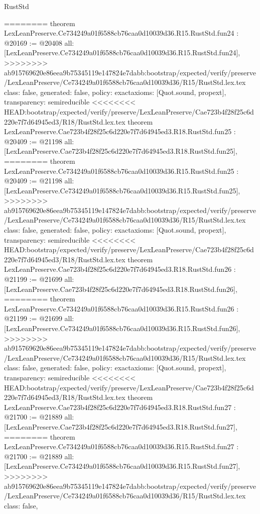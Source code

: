 \begin{lexlean}{RustStd}
\begin{coremodule}
{\begin{coremodule}
{{{{{{{{{{{{{{{{{{{{{{{{{{{========
theorem LexLeanPreserve.Ce734249a01f6588cb76caa0d10039d36.R15.RustStd.fun24 : @20169 := @20408 {
  all: [LexLeanPreserve.Ce734249a01f6588cb76caa0d10039d36.R15.RustStd.fun24],
>>>>>>>> ab915769620e86eea9b75345119e147824e7dabb:bootstrap/expected/verify/preserve/LexLeanPreserve/Ce734249a01f6588cb76caa0d10039d36/R15/RustStd.lex.tex
  class: false,
  generated: false,
  policy: exact{axioms: [Quot.sound, propext]},
  transparency: semireducible
}
<<<<<<<< HEAD:bootstrap/expected/verify/preserve/LexLeanPreserve/Cae723b4f28f25c6d220e7f7d64945ed3/R18/RustStd.lex.tex
theorem LexLeanPreserve.Cae723b4f28f25c6d220e7f7d64945ed3.R18.RustStd.fun25 : @20409 := @21198 {
  all: [LexLeanPreserve.Cae723b4f28f25c6d220e7f7d64945ed3.R18.RustStd.fun25],
========
theorem LexLeanPreserve.Ce734249a01f6588cb76caa0d10039d36.R15.RustStd.fun25 : @20409 := @21198 {
  all: [LexLeanPreserve.Ce734249a01f6588cb76caa0d10039d36.R15.RustStd.fun25],
>>>>>>>> ab915769620e86eea9b75345119e147824e7dabb:bootstrap/expected/verify/preserve/LexLeanPreserve/Ce734249a01f6588cb76caa0d10039d36/R15/RustStd.lex.tex
  class: false,
  generated: false,
  policy: exact{axioms: [Quot.sound, propext]},
  transparency: semireducible
}
<<<<<<<< HEAD:bootstrap/expected/verify/preserve/LexLeanPreserve/Cae723b4f28f25c6d220e7f7d64945ed3/R18/RustStd.lex.tex
theorem LexLeanPreserve.Cae723b4f28f25c6d220e7f7d64945ed3.R18.RustStd.fun26 : @21199 := @21699 {
  all: [LexLeanPreserve.Cae723b4f28f25c6d220e7f7d64945ed3.R18.RustStd.fun26],
========
theorem LexLeanPreserve.Ce734249a01f6588cb76caa0d10039d36.R15.RustStd.fun26 : @21199 := @21699 {
  all: [LexLeanPreserve.Ce734249a01f6588cb76caa0d10039d36.R15.RustStd.fun26],
>>>>>>>> ab915769620e86eea9b75345119e147824e7dabb:bootstrap/expected/verify/preserve/LexLeanPreserve/Ce734249a01f6588cb76caa0d10039d36/R15/RustStd.lex.tex
  class: false,
  generated: false,
  policy: exact{axioms: [Quot.sound, propext]},
  transparency: semireducible
}
<<<<<<<< HEAD:bootstrap/expected/verify/preserve/LexLeanPreserve/Cae723b4f28f25c6d220e7f7d64945ed3/R18/RustStd.lex.tex
theorem LexLeanPreserve.Cae723b4f28f25c6d220e7f7d64945ed3.R18.RustStd.fun27 : @21700 := @21889 {
  all: [LexLeanPreserve.Cae723b4f28f25c6d220e7f7d64945ed3.R18.RustStd.fun27],
========
theorem LexLeanPreserve.Ce734249a01f6588cb76caa0d10039d36.R15.RustStd.fun27 : @21700 := @21889 {
  all: [LexLeanPreserve.Ce734249a01f6588cb76caa0d10039d36.R15.RustStd.fun27],
>>>>>>>> ab915769620e86eea9b75345119e147824e7dabb:bootstrap/expected/verify/preserve/LexLeanPreserve/Ce734249a01f6588cb76caa0d10039d36/R15/RustStd.lex.tex
  class: false,
}}}}}}}}}}}}}}}}}}}}}}}}}}}}}}}
\end{coremodule}}
\end{coremodule}
\end{lexlean}

